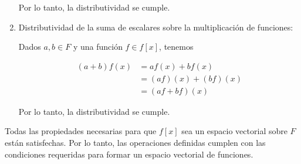 \begin{enumerate}
    Por lo tanto, la distributividad se cumple.

    \item Distributividad de la suma de escalares sobre la multiplicación de funciones: 
    
    Dados $a, b \in F$ y una función $f \in f[x]$, tenemos
    
    \begin{align*}
        (a + b)f(x) &= af(x) + bf(x) \\
        &= (af)(x) + (bf)(x) \\
        &= (af + bf)(x)
    \end{align*}
    
    Por lo tanto, la distributividad se cumple.
    
\end{enumerate}

Todas las propiedades necesarias para que $f[x]$ sea un espacio vectorial sobre $F$ están satisfechas. Por lo tanto, las operaciones definidas cumplen con las condiciones requeridas para formar un espacio vectorial de funciones.

